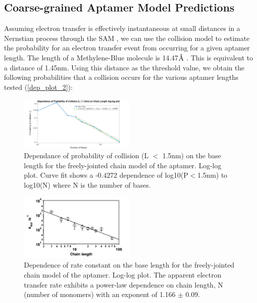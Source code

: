 \subsection{Coarse-grained Aptamer Model Predictions}
Assuming electron transfer is effectively instantaneous at small distances in a Nernstian process through the SAM \cite{finklea1992electron,smalley1995kinetics}, we can use the collision model \cite{huang2013random} to estimate the probability for an electron transfer event from occurring for a given aptamer length. The length of a Methylene-Blue molecule is 14.47$\textup{\AA}$ \cite{dotto2015adsorption}. This is equivalent to a distance of 1.45nm. Using this distance as the threshold value, we obtain the following probabilities that a collision occurs for the various aptamer lengths tested (\autoref{dep_plot_2}):
\begin{figure}[H]
    \centering
    \includegraphics[width = 0.5\textwidth]{img/Length_dep_bases_log.png}
    \caption{Dependance of probability of collision (L $<$ 1.5nm) on the base length for the freely-jointed chain model of the aptamer. Log-log plot. Curve fit shows a -0.4272 dependence of log10(P$<$1.5nm) to log10(N) where N is the number of bases.}
    \label{dep_plot_2}
\end{figure}
\begin{figure}[H]
    \centering
    \includegraphics[width = 0.5\textwidth]{img/Plaxco_k_app_vs_length.png}
    \caption{Dependence of rate constant on the base length for the freely-jointed chain model of the aptamer. Log-log plot. The apparent electron transfer rate exhibits a power-law dependence on chain length, N (number of monomers) with an exponent of 1.166 $\pm$ 0.09. \cite{uzawa2010mechanistic}}
    \label{plaxco_plot}
\end{figure}
